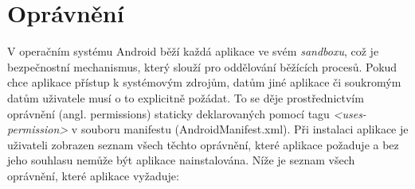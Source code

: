\documentclass{diplomka}
\begin{document}
\section{Oprávnění}
V operačním systému Android běží každá aplikace ve svém \emph{sandboxu}, což je bezpečnostní mechanismus, který slouží pro oddělování běžících procesů. Pokud chce aplikace přístup k systémovým zdrojům, datům jiné aplikace či soukromým datům uživatele musí o to explicitně požádat. To se děje prostřednictvím oprávnění (angl. permissions) staticky deklarovaných pomocí tagu \emph{<uses-permission>} v souboru manifestu (AndroidManifest.xml). Při instalaci aplikace je uživateli zobrazen seznam všech těchto oprávnění, které aplikace požaduje a bez jeho souhlasu nemůže být aplikace nainstalována. Níže je seznam všech oprávnění, které aplikace vyžaduje:
\end{document}
